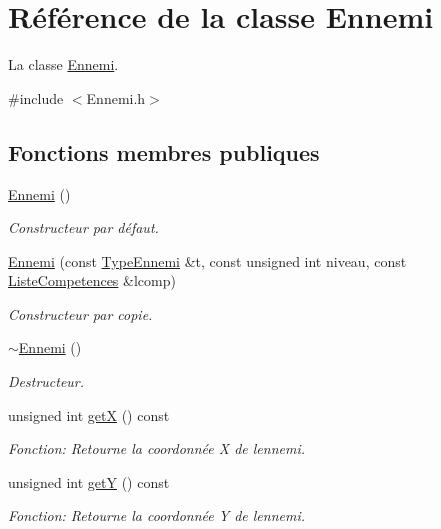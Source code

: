 \hypertarget{classEnnemi}{}\section{Référence de la classe Ennemi}
\label{classEnnemi}


La classe \mbox{\hyperlink{classEnnemi}{Ennemi}}.  




{\ttfamily \#include $<$Ennemi.\+h$>$}

\subsection*{Fonctions membres publiques}
\begin{DoxyCompactItemize}
\item 
\mbox{\label{classEnnemi_a9c5eb7ca82848b97f3dcf262fe625b3a}} 
\mbox{\hyperlink{classEnnemi_a9c5eb7ca82848b97f3dcf262fe625b3a}{Ennemi}} ()
\begin{DoxyCompactList}\small\item\em Constructeur par défaut. \end{DoxyCompactList}\item 
\mbox{\hyperlink{classEnnemi_a1c72587b923538f5499ccd81e13651a5}{Ennemi}} (const \mbox{\hyperlink{structTypeEnnemi}{Type\+Ennemi}} \&t, const unsigned int niveau, const \mbox{\hyperlink{structListeCompetences}{Liste\+Competences}} \&lcomp)
\begin{DoxyCompactList}\small\item\em Constructeur par copie. \end{DoxyCompactList}\item 
\mbox{\hyperlink{classEnnemi_adf402a9389efe705c604f91d6e74d00e}{$\sim$\+Ennemi}} ()
\begin{DoxyCompactList}\small\item\em Destructeur. \end{DoxyCompactList}\item 
unsigned int \mbox{\hyperlink{classEnnemi_a7d6bedb6cf6b7564816a9957812e5b67}{getX}} () const
\begin{DoxyCompactList}\small\item\em Fonction\+: Retourne la coordonnée X de l\textquotesingle{}ennemi. \end{DoxyCompactList}\item 
unsigned int \mbox{\hyperlink{classEnnemi_af30deadaf8e569d3f82c716bf463791f}{getY}} () const
\begin{DoxyCompactList}\small\item\em Fonction\+: Retourne la coordonnée Y de l\textquotesingle{}ennemi. \end{DoxyCompactList}\item 

\end{DoxyCompactItemize}
